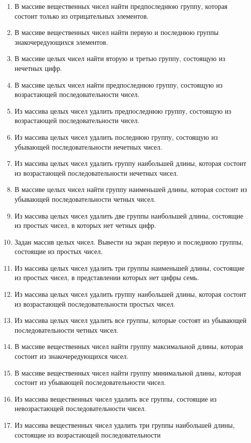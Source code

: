 \begin{enumerate}
\item В массиве вещественных чисел найти предпоследнюю группу, которая состоит только из отрицательных элементов.
\item В массиве вещественных чисел найти первую и последнюю группы знакочередующихся элементов.
\item В массиве целых чисел найти вторую и третью группу, состоящую из нечетных цифр.
\item В массиве целых чисел найти предпоследнюю группу, состоящую из возрастающей последовательности чисел.
\item Из массива целых чисел удалить предпоследнюю группу, состоящую из возрастающей последовательности чисел.
\item Из массива целых чисел удалить последнюю группу, состоящую из убывающей последовательности нечетных чисел.
\item Из массива целых чисел удалить группу наибольшей длины, которая состоит из возрастающей последовательности
нечетных чисел.
\item В массиве целых чисел найти группу наименьшей длины, которая состоит из убывающей последовательности четных чисел.
\item Из массива целых чисел удалить две группы наибольшей длины, состоящие из простых чисел, в которых нет четных цифр.
\item Задан массив целых чисел. Вывести на экран первую и последнюю группы, состоящие из простых чисел.
\item Из массива целых чисел удалить три группы наименьшей длины, состоящие из простых чисел, в представлении которых
нет цифры семь.
\item Из массива целых чисел удалить группу наибольшей длины, которая состоит из возрастающей последовательности простых
чисел.
\item Из массива целых чисел удалить все группы, которые состоят из убывающей последовательности четных чисел.
\item В массиве вещественных чисел найти группу максимальной длины, которая состоит из знакочередующихся чисел.
\item В массиве вещественных чисел найти группу минимальной длины, которая состоит из убывающей последовательности
чисел.
\item Из массива вещественных чисел удалить все группы, состоящие из невозрастающей последовательности чисел.
\item Из массива вещественных чисел удалить три группы наибольшей длины, состоящие из возрастающей последовательности

\end{enumerate}
